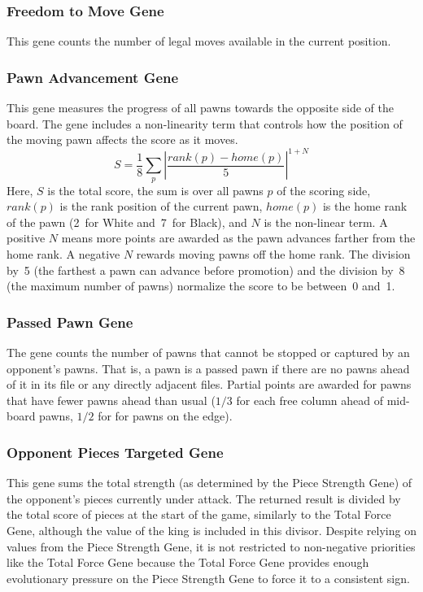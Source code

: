 \documentclass[letterpaper]{article}
\renewcommand{\_}{\allowbreak\textunderscore\allowbreak}
\begin{document}
\subsubsection{Freedom to Move Gene}
This gene counts the number of legal moves available in the current position.

\subsubsection{Pawn Advancement Gene}
This gene measures the progress of all pawns towards the opposite side of the board. The gene includes a non-linearity term that controls how the position of the moving pawn affects the score as it moves.
\[S = \frac{1}{8}\sum_p \left|\frac{rank(p) - home(p)}{5}\right|^{1 + N}\]
Here, \(S\) is the total score, the sum is over all pawns \(p\) of the scoring side, \(rank(p)\) is the rank position of the current pawn, \(home(p)\) is the home rank of the pawn (2~for White and~7~for Black), and \(N\) is the non-linear term. A positive \(N\) means more points are awarded as the pawn advances farther from the home rank. A negative \(N\) rewards moving pawns off the home rank. The division by~5 (the farthest a pawn can advance before promotion) and the division by~8 (the maximum number of pawns) normalize the score to be between~0 and~1.

\subsubsection{Passed Pawn Gene}
The gene counts the number of pawns that cannot be stopped or captured by an opponent's pawns. That is, a pawn is a passed pawn if there are no pawns ahead of it in its file or any directly adjacent files. Partial points are awarded for pawns that have fewer pawns ahead than usual (\(1/3\) for each free column ahead of mid-board pawns, \(1/2\) for for pawns on the edge).

\subsubsection{Opponent Pieces Targeted Gene}\label{opponent-pieces-targeted}
This gene sums the total strength (as determined by the Piece Strength Gene) of the opponent's pieces currently under attack. The returned result is divided by the total score of pieces at the start of the game, similarly to the Total Force Gene, although the value of the king is included in this divisor. Despite relying on values from the Piece Strength Gene, it is not restricted to non-negative priorities like the Total Force Gene because the Total Force Gene provides enough evolutionary pressure on the Piece Strength Gene to force it to a consistent sign.
\end{document}
